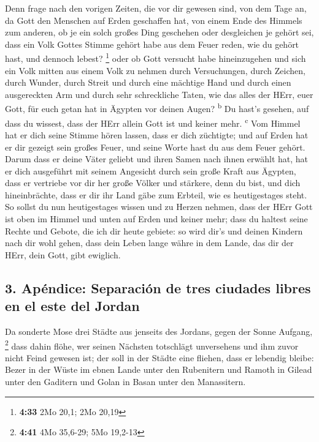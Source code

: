  Denn frage nach den vorigen Zeiten, die vor dir gewesen
sind, von dem Tage an, da Gott den Menschen auf Erden geschaffen hat,
von einem Ende des Himmels zum anderen, ob je ein solch großes Ding
geschehen oder desgleichen je gehört sei,  dass ein Volk
Gottes Stimme gehört habe aus dem Feuer reden, wie du gehört hast, und
dennoch lebest? \footnote{\textbf{4:33} 2Mo 20,1; 2Mo 20,19}
 oder ob Gott versucht habe hineinzugehen und sich ein
Volk mitten aus einem Volk zu nehmen durch Versuchungen, durch Zeichen,
durch Wunder, durch Streit und durch eine mächtige Hand und durch einen
ausgereckten Arm und durch sehr schreckliche Taten, wie das alles der
HErr, euer Gott, für euch getan hat in Ägypten vor deinen Augen?
\textsuperscript{b}  Du hast's gesehen, auf dass du
wissest, dass der HErr allein Gott ist und keiner mehr.
\textsuperscript{c}  Vom Himmel hat er dich seine Stimme
hören lassen, dass er dich züchtigte; und auf Erden hat er dir gezeigt
sein großes Feuer, und seine Worte hast du aus dem Feuer gehört.
 Darum dass er deine Väter geliebt und ihren Samen nach
ihnen erwählt hat, hat er dich ausgeführt mit seinem Angesicht durch
sein große Kraft aus Ägypten,  dass er vertriebe vor dir
her große Völker und stärkere, denn du bist, und dich hineinbrächte,
dass er dir ihr Land gäbe zum Erbteil, wie es heutigestages steht.
 So sollst du nun heutigestages wissen und zu Herzen
nehmen, dass der HErr Gott ist oben im Himmel und unten auf Erden und
keiner mehr;  dass du haltest seine Rechte und Gebote,
die ich dir heute gebiete: so wird dir's und deinen Kindern nach dir
wohl gehen, dass dein Leben lange währe in dem Lande, das dir der HErr,
dein Gott, gibt ewiglich.

\hypertarget{apuxe9ndice-separaciuxf3n-de-tres-ciudades-libres-en-el-este-del-jordan}{%
\subsection{3. Apéndice: Separación de tres ciudades libres en el este
del
Jordan}\label{apuxe9ndice-separaciuxf3n-de-tres-ciudades-libres-en-el-este-del-jordan}}

 Da sonderte Mose drei Städte aus jenseits des Jordans,
gegen der Sonne Aufgang, \footnote{\textbf{4:41} 4Mo 35,6-29; 5Mo
  19,2-13}  dass dahin flöhe, wer seinen Nächsten
totschlägt unversehens und ihm zuvor nicht Feind gewesen ist; der soll
in der Städte eine fliehen, dass er lebendig bleibe: 
Bezer in der Wüste im ebnen Lande unter den Rubenitern und Ramoth in
Gilead unter den Gaditern und Golan in Basan unter den Manassitern.

